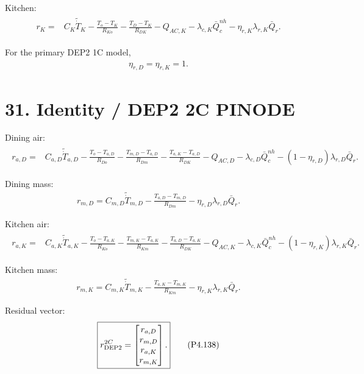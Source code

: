 \documentclass[11pt]{article}
\begin{document}
Kitchen:
\begin{align}
\boxed{
\begin{aligned}
r_K
={}&
C_K\widetilde{\dot T}_K
-
\frac{T_o-T_K}{R_{Ko}}
-
\frac{T_D-T_K}{R_{DK}}
-
Q_{AC,K}
-
\lambda_{c,K}\bar Q_c^{nh}
-
\eta_{r,K}\lambda_{r,K}\bar Q_r.
\end{aligned}
}
\tag{P4.132}
\end{align}

For the primary DEP2 1C model,
\begin{align}
\boxed{\eta_{r,D}=\eta_{r,K}=1.}
\tag{P4.133}
\end{align}

\section*{31. Identity / DEP2 2C PINODE}

Dining air:
\begin{align}
\boxed{
\begin{aligned}
r_{a,D}
={}&
C_{a,D}\widetilde{\dot T}_{a,D}
-
\frac{T_o-T_{a,D}}{R_{Do}}
-
\frac{T_{m,D}-T_{a,D}}{R_{Dm}}
-
\frac{T_{a,K}-T_{a,D}}{R_{DK}}
-
Q_{AC,D}
-
\lambda_{c,D}\bar Q_c^{nh}
-
(1-\eta_{r,D})\lambda_{r,D}\bar Q_r.
\end{aligned}
}
\tag{P4.134}
\end{align}

Dining mass:
\begin{align}
\boxed{
r_{m,D}
=
C_{m,D}\widetilde{\dot T}_{m,D}
-
\frac{T_{a,D}-T_{m,D}}{R_{Dm}}
-
\eta_{r,D}\lambda_{r,D}\bar Q_r.
}
\tag{P4.135}
\end{align}

Kitchen air:
\begin{align}
\boxed{
\begin{aligned}
r_{a,K}
={}&
C_{a,K}\widetilde{\dot T}_{a,K}
-
\frac{T_o-T_{a,K}}{R_{Ko}}
-
\frac{T_{m,K}-T_{a,K}}{R_{Km}}
-
\frac{T_{a,D}-T_{a,K}}{R_{DK}}
-
Q_{AC,K}
-
\lambda_{c,K}\bar Q_c^{nh}
-
(1-\eta_{r,K})\lambda_{r,K}\bar Q_r.
\end{aligned}
}
\tag{P4.136}
\end{align}

Kitchen mass:
\begin{align}
\boxed{
r_{m,K}
=
C_{m,K}\widetilde{\dot T}_{m,K}
-
\frac{T_{a,K}-T_{m,K}}{R_{Km}}
-
\eta_{r,K}\lambda_{r,K}\bar Q_r.
}
\tag{P4.137}
\end{align}

Residual vector:
\begin{align}
\boxed{
r_{\rm DEP2}^{2C}
=
\begin{bmatrix}
r_{a,D}\\r_{m,D}\\r_{a,K}\\r_{m,K}
\end{bmatrix}.
}
\tag{P4.138}
\end{align}
\end{document}
